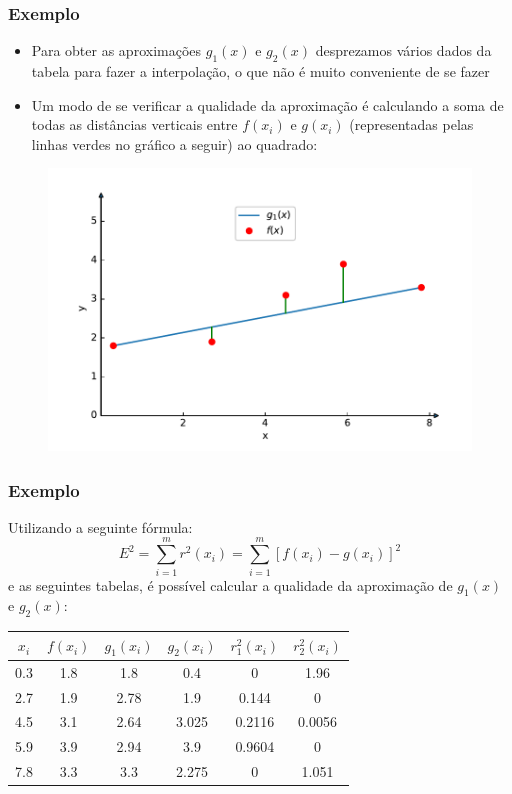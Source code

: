 \documentclass{beamer}
\theoremstyle{mystyle}
\begin{document}
	\begin{frame}
		\frametitle{Exemplo}
		\begin{itemize}
			\item Para obter as aproximações $ g_{1}(x) $ e $ g_{2}(x) $ desprezamos vários dados da tabela para fazer a interpolação, o que não é muito	conveniente de se fazer
			\item Um modo de se verificar a qualidade da aproximação é calculando a soma de todas as distâncias verticais entre $ f (x_{i} ) $ e $ g (x_{i} ) $ (representadas pelas linhas verdes no gráfico a seguir) ao quadrado:			
		\end{itemize}
		\begin{figure}
			\centering
			\includegraphics[width=0.6\linewidth]{Figuras/grafico_04}
			\label{fig:grafico04}
		\end{figure}	
	\end{frame}

	\begin{frame}
		\frametitle{Exemplo}
		Utilizando a seguinte fórmula:
		\begin{equation}\label{Eq.1}
			E^{2} = \sum_{i=1}^{m} r^{2}(x_{i}) = \sum_{i=1}^{m} [f(x_{i}) - g(x_{i})]^{2}
		\end{equation}
		e as seguintes tabelas, é possível calcular a qualidade da aproximação de $ g_{1}(x) $ e $ g_{2}(x) $:
		\begin{table}
			\small 
			\centering
			\begin{tabular}{c|ccc|cc}
				$ x_{i} $ & $ f(x_{i}) $ & $ g_{1}(x_{i}) $ & $ g_{2}(x_{i}) $ & $ r_{1}^{2}(x_{i}) $ & $ r_{2}^{2}(x_{i}) $ \\
				\hline
				\hline
				0.3 & 1.8 & 1.8 & 0.4 & 0 & 1.96\\
				2.7 & 1.9 & 2.78 & 1.9 & 0.144 & 0\\
				4.5 & 3.1 & 2.64 & 3.025 & 0.2116 & 0.0056\\
				5.9 & 3.9 & 2.94 & 3.9 & 0.9604 & 0\\
				7.8 & 3.3 & 3.3 & 2.275 & 0 & 1.051
			\end{tabular}
		\end{table}
	\end{frame}
\end{document}
